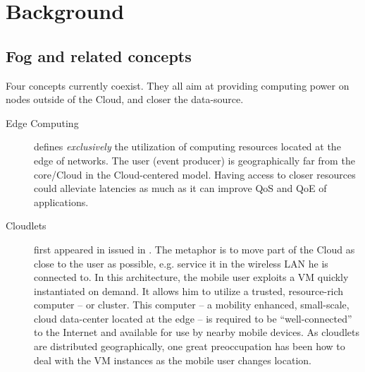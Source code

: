 \documentclass[11pt]{sdm}
\begin{document}
\section{Background}
\label{sec:background}

\subsection{Fog and related concepts}

Four concepts currently coexist. They all aim at providing computing power on nodes outside of the Cloud, and closer the data-source.

\begin{description}
	\item[Edge Computing] defines \emph{exclusively} the utilization of computing resources located at the edge of networks. The user (event producer) is geographically far from the core/Cloud in the Cloud-centered model. Having access to closer resources could alleviate latencies as much as it can improve \gls{QoS} and \gls{QoE} of applications.

	\item[Cloudlets] first appeared in \cite{satyanarayanan_case_2009} issued in . The metaphor is to move part of the Cloud as close to the user as possible, e.g. service it in the wireless LAN he is connected to. In this architecture, the mobile user exploits a \gls{VM} quickly instantiated on demand. It allows him to utilize a trusted, resource-rich computer -- or cluster. This computer -- a mobility enhanced, small-scale, cloud data-center located at the edge -- is required to be ``well-connected'' to the Internet and available for use by nearby mobile devices. As cloudlets are distributed geographically, one great preoccupation has been how to deal with the \gls{VM} instances as the mobile user changes location.


\end{description}
\end{document}
